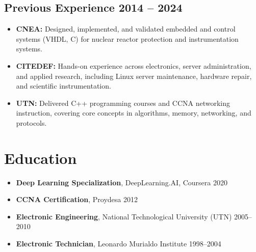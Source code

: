 \documentclass[11pt]{article} %
\begin{document}
\subsection{Previous Experience \hfill 2014 -- 2024}
\begin{itemize}
    \item{\textbf{CNEA:} Designed, implemented, and validated embedded and control systems (VHDL, C) for nuclear reactor protection and instrumentation systems.}
    \item{\textbf{CITEDEF:} Hands-on experience across electronics, server administration, and applied research, including Linux server maintenance, hardware repair, and scientific instrumentation.}
    \item{\textbf{UTN:} Delivered C++ programming courses and CCNA networking instruction, covering core concepts in algorithms, memory, networking, and protocols.}
\end{itemize}

\section{Education}
\begin{itemize}
    \item{\textbf{Deep Learning Specialization}, DeepLearning.AI, Coursera \hfill 2020}
    \item{\textbf{CCNA Certification}, Proydesa \hfill 2012}
    \item{\textbf{Electronic Engineering}, National Technological University (UTN) \hfill 2005--2010}
    \item{\textbf{Electronic Technician}, Leonardo Murialdo Institute \hfill 1998--2004}
\end{itemize}
\end{document}
